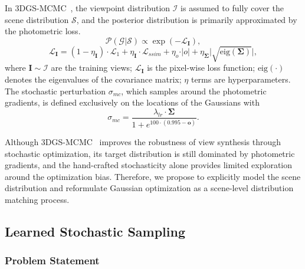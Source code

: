 \documentclass[lettersize,journal]{IEEEtran}
\begin{document}
In 3DGS-MCMC~\cite{mcmc}, the viewpoint distribution $\mathcal{I}$ is assumed to fully cover the scene distribution $\mathcal{S}$, and the posterior distribution is primarily approximated by the photometric loss. 
\begin{equation}
    \mathcal{P}(\mathcal{G} \vert \mathcal{S}) \propto \exp \left( - \mathcal{L}_{\mathbf{I}} \right), 
    \label{eq2}
\end{equation}
\begin{equation}
    \mathcal{L}_{\mathbf{I}} = \left( 1 - \eta_{\mathbf{I}} \right) \cdot \mathcal{L}_{1} + \eta_{\mathbf{I}} \cdot \mathcal{L}_{ssim} + \eta_{o} \cdot \vert o \vert + \eta_{\mathbf{\Sigma}} \vert \sqrt{\text{eig}(\mathbf{\Sigma})} \vert, 
    \label{eq3}
\end{equation}
where $\mathbf{I} \sim \mathcal{I}$ are the training views; $\mathcal{L}_{\mathbf{I}}$ is the pixel-wise loss function; $\text{eig}(\cdot)$ denotes the eigenvalues of the covariance matrix; $\eta$ terms are hyperparameters.
The stochastic perturbation $\sigma_{mc}$, which samples around the photometric gradients, is defined exclusively on the locations of the Gaussians with 
\begin{equation}
    \sigma_{mc} = \frac{\lambda_{lr} \cdot \mathbf{\Sigma}}{1 + e^{100 \cdot \left( 0.995 - \mathbf{o} \right)}}.
    \label{eq4}
\end{equation}

{
Although 3DGS-MCMC~\cite{mcmc} improves the robustness of view synthesis through stochastic optimization, its target distribution is still dominated by photometric gradients, and the hand-crafted stochasticity alone provides limited exploration around the optimization bias. 
Therefore, we propose to explicitly model the scene distribution and reformulate Gaussian optimization as a scene-level distribution matching process. 
}

\subsection{Learned Stochastic Sampling}

\subsubsection{Problem Statement}
\end{document}
